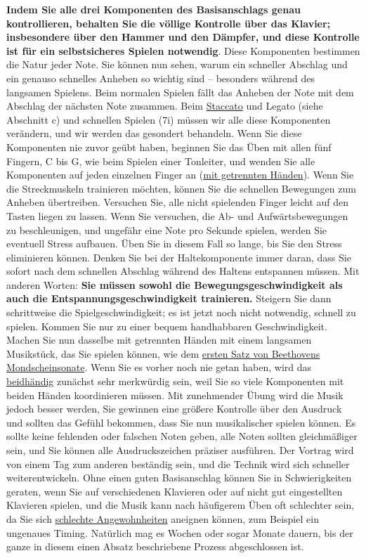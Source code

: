 \textbf{Indem Sie alle drei Komponenten des Basisanschlags genau kontrollieren, behalten Sie die völlige Kontrolle über das Klavier; insbesondere über den Hammer und den Dämpfer, und diese Kontrolle ist für ein selbstsicheres Spielen notwendig}.
Diese Komponenten bestimmen die Natur jeder Note.
Sie können nun sehen, warum ein schneller Abschlag und ein genauso schnelles Anheben so wichtig sind -- besonders während des langsamen Spielens.
Beim normalen Spielen fällt das Anheben der Note mit dem Abschlag der nächsten Note zusammen.
Beim \hyperref[c1iii1c]{Staccato} und Legato (siehe Abschnitt c) und schnellen Spielen (7i) müssen wir alle diese Komponenten verändern, und wir werden das gesondert behandeln.
Wenn Sie diese Komponenten nie zuvor geübt haben, beginnen Sie das Üben mit allen fünf Fingern, C bis G, wie beim Spielen einer Tonleiter, und wenden Sie alle Komponenten auf jeden einzelnen Finger an (\hyperref[c1ii7]{mit getrennten Händen}).
Wenn Sie die Streckmuskeln trainieren möchten, können Sie die schnellen Bewegungen zum Anheben übertreiben.
Versuchen Sie, alle nicht spielenden Finger leicht auf den Tasten liegen zu lassen.
Wenn Sie versuchen, die Ab- und Aufwärtsbewegungen zu beschleunigen, und ungefähr eine Note pro Sekunde spielen, werden Sie eventuell Stress aufbauen.
Üben Sie in diesem Fall so lange, bis Sie den Stress eliminieren können.
Denken Sie bei der Haltekomponente immer daran, dass Sie sofort nach dem schnellen Abschlag während des Haltens entspannen müssen.
Mit anderen Worten: \textbf{Sie müssen sowohl die Bewegungsgeschwindigkeit als auch die Entspannungsgeschwindigkeit trainieren.}
Steigern Sie dann schrittweise die Spielgeschwindigkeit; es ist jetzt noch nicht notwendig, schnell zu spielen.
Kommen Sie nur zu einer bequem handhabbaren Geschwindigkeit.
Machen Sie nun dasselbe mit getrennten Händen mit einem langsamen Musikstück, das Sie spielen können, wie dem \hyperref[c1ii25b]{ersten Satz von Beethovens Mondscheinsonate}.
Wenn Sie es vorher noch nie getan haben, wird das \hyperref[c1ii25]{beidhändig} zunächst sehr merkwürdig sein, weil Sie so viele Komponenten mit beiden Händen koordinieren müssen.
Mit zunehmender Übung wird die Musik jedoch besser werden, Sie gewinnen eine größere Kontrolle über den Ausdruck und sollten das Gefühl bekommen, dass Sie nun musikalischer spielen können.
Es sollte keine fehlenden oder falschen Noten geben, alle Noten sollten gleichmäßiger sein, und Sie können alle Ausdruckszeichen präziser ausführen.
Der Vortrag wird von einem Tag zum anderen beständig sein, und die Technik wird sich schneller weiterentwickeln.
Ohne einen guten Basisanschlag können Sie in Schwierigkeiten geraten, wenn Sie auf verschiedenen Klavieren oder auf nicht gut eingestellten Klavieren spielen, und die Musik kann nach häufigerem Üben oft schlechter sein, da Sie sich \hyperref[c1ii22]{schlechte Angewohnheiten} aneignen können, zum Beispiel ein ungenaues Timing.
Natürlich mag es Wochen oder sogar Monate dauern, bis der ganze in diesem einen Absatz beschriebene Prozess abgeschlossen ist.



